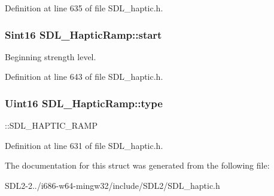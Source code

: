 Definition at line 635 of file S\+D\+L\+\_\+haptic.\+h.

\hypertarget{structSDL__HapticRamp_acc0e813ac6399290fd4a788d2471e8d4}{
\subsubsection[{start}]{\setlength{\rightskip}{0pt plus 5cm}Sint16 S\+D\+L\+\_\+\+Haptic\+Ramp\+::start}}\label{structSDL__HapticRamp_acc0e813ac6399290fd4a788d2471e8d4}
Beginning strength level. 

Definition at line 643 of file S\+D\+L\+\_\+haptic.\+h.

\hypertarget{structSDL__HapticRamp_aca1c2349372433822ab62f60976640aa}{
\subsubsection[{type}]{\setlength{\rightskip}{0pt plus 5cm}Uint16 S\+D\+L\+\_\+\+Haptic\+Ramp\+::type}}\label{structSDL__HapticRamp_aca1c2349372433822ab62f60976640aa}
\+::\+S\+D\+L\+\_\+\+H\+A\+P\+T\+I\+C\+\_\+\+R\+A\+M\+P 

Definition at line 631 of file S\+D\+L\+\_\+haptic.\+h.



The documentation for this struct was generated from the following file\+:\begin{DoxyCompactItemize}
\item 
S\+D\+L2-\/2../i686-\/w64-\/mingw32/include/\+S\+D\+L2/S\+D\+L\+\_\+haptic.\+h\end{DoxyCompactItemize}
